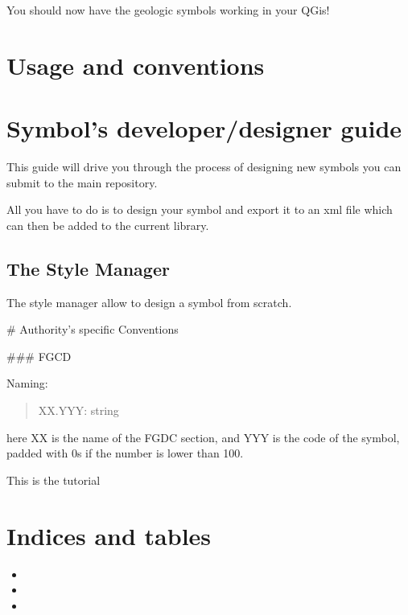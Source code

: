 \documentclass[letterpaper,10pt,english]{sphinxmanual}
\begin{document}
You should now have the geologic symbols working in your QGis!


\chapter{Usage and conventions}
\label{\detokenize{usage:usage-and-conventions}}\label{\detokenize{usage::doc}}

\chapter{Symbol’s developer/designer guide}
\label{\detokenize{developers_guide:symbol-s-developer-designer-guide}}\label{\detokenize{developers_guide::doc}}
This guide will drive you through the process of designing new symbols you can submit to the main repository.

All you have to do is to design your symbol and export it to an xml file which can then be added to the current library.


\section{The Style Manager}
\label{\detokenize{developers_guide:the-style-manager}}
The style manager allow to design a symbol from scratch.

\noindent{}

\# Authority’s specific Conventions

\#\#\# FGCD

Naming:
\begin{quote}

XX.YYY: string
\end{quote}

here XX is the name of the FGDC section, and YYY is the code of the symbol, padded with 0s if the number is lower than 100.

This is the tutorial


\chapter{Indices and tables}
\label{\detokenize{index:indices-and-tables}}\begin{itemize}
\item {} 

\item {} 

\item {} 

\end{itemize}



\renewcommand{\indexname}{Index}
\printindex
\end{document}
